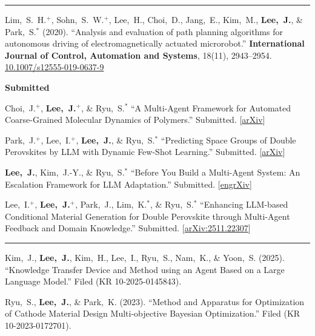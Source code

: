 \documentclass[11pt, a4paper]{article}
\newenvironment{cvsec}[1]{%
  \par\vspace{0.9em}%
  \noindent{\large\bfseries #1}\par\nobreak%
  \vspace{2pt}%
  \noindent\rule{\linewidth}{0.4pt}\par\nobreak%
  \vspace{3pt}%
  \noindent%
}{%
  \vspace{2pt}%
}
\newenvironment{pubrev}[1]{%
  \begin{etaremune}[leftmargin=2em, itemsep=5pt, parsep=0pt, topsep=0pt, partopsep=0pt, start=#1]%
}{%
  \end{etaremune}%
}
\begin{document}
\begin{cvsec}{Publications}
\begin{pubrev}{18}
\item Lim,~S.~H.$^+$, Sohn,~S.~W.$^+$, Lee,~H., Choi,~D., Jang,~E., Kim,~M., \textbf{Lee,~J.}, \& Park,~S.$^*$ (2020).
``Analysis and evaluation of path planning algorithms for autonomous driving of electromagnetically actuated microrobot.''
\textbf{International Journal of Control, Automation and Systems}, 18(11), 2943--2954.
\href{https://doi.org/10.1007/s12555-019-0637-9}{10.1007/s12555-019-0637-9}

\end{pubrev}

\vspace{3pt}
\textbf{Submitted}
\begin{pubrev}{4}

\item Choi,~J.$^+$, \textbf{Lee,~J.}$^+$, \& Ryu,~S.$^*$
``A Multi-Agent Framework for Automated Coarse-Grained Molecular Dynamics of Polymers.'' Submitted.
[\href{https://arxiv.org/abs/2608.06694}{arXiv}]

\item Park,~J.$^+$, Lee,~I.$^+$, \textbf{Lee,~J.}, \& Ryu,~S.$^*$
``Predicting Space Groups of Double Perovskites by LLM with Dynamic Few-Shot Learning.'' Submitted.
[\href{https://arxiv.org/abs/2608.10483}{arXiv}]

\item \textbf{Lee,~J.}, Kim,~J.-Y., \& Ryu,~S.$^*$
``Before You Build a Multi-Agent System: An Escalation Framework for LLM Adaptation.'' Submitted.
[\href{https://doi.org/10.31224/7524}{engrXiv}]

\item Lee,~I.$^+$, \textbf{Lee,~J.}$^+$, Park,~J., Lim,~K.$^*$, \& Ryu,~S.$^*$
``Enhancing LLM-based Conditional Material Generation for Double Perovskite through Multi-Agent Feedback and Domain Knowledge.'' Submitted.
[\href{https://arxiv.org/abs/2511.22307}{arXiv:2511.22307}]

\end{pubrev}

\end{cvsec}

\begin{cvsec}{Patents}

\begin{pubrev}{2}

\item Kim,~J., \textbf{Lee,~J.}, Kim,~H., Lee,~I., Ryu,~S., Nam,~K., \& Yoon,~S. (2025).
``Knowledge Transfer Device and Method using an Agent Based on a Large Language Model.''
Filed (KR 10-2025-0145843).

\item Ryu,~S., \textbf{Lee,~J.}, \& Park,~K. (2023).
``Method and Apparatus for Optimization of Cathode Material Design Multi-objective Bayesian Optimization.''
Filed (KR 10-2023-0172701).

\end{pubrev}

\end{cvsec}
\end{document}
